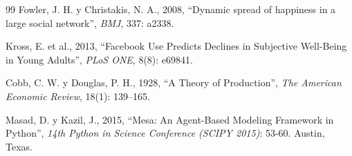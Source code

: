 \documentclass[a4paper,12pt]{article}
\begin{document}
\begin{thebibliography}{99}
Fowler, J. H. y Christakis, N. A., 2008, “Dynamic spread of happiness in a large social network”, \textit{BMJ}, 337: a2338.

Kross, E. et al., 2013, “Facebook Use Predicts Declines in Subjective Well-Being in Young Adults”, \textit{PLoS ONE}, 8(8): e69841.

Cobb, C. W. y Douglas, P. H., 1928, “A Theory of Production”, \textit{The American Economic Review}, 18(1): 139–165.

Masad, D. y Kazil, J., 2015, “Mesa: An Agent-Based Modeling Framework in Python”, \textit{14th Python in Science Conference (SCIPY 2015)}: 53-60. Austin, Texas.

\end{thebibliography}
\end{document}
